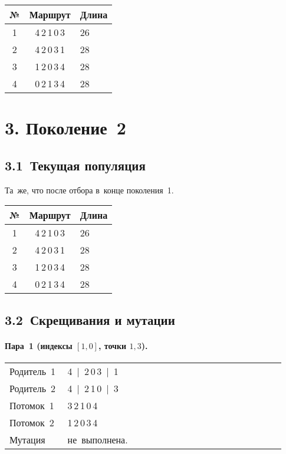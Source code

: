 \documentclass[a4paper,12pt]{article}
\begin{document}
\begin{center}
\begin{tabular}{ccl}
\toprule
№ & Маршрут & Длина\\\midrule
1 & 4\,2\,1\,0\,3 & 26\\
2 & 4\,2\,0\,3\,1 & 28\\
3 & 1\,2\,0\,3\,4 & 28\\
4 & 0\,2\,1\,3\,4 & 28\\
\bottomrule
\end{tabular}
\end{center}

\section*{3. Поколение 2}

\subsection*{3.1 Текущая популяция}

Та же, что после отбора в конце поколения 1.
\begin{center}
\begin{tabular}{ccl}
\toprule
№ & Маршрут & Длина\\\midrule
1 & 4\,2\,1\,0\,3 & 26\\
2 & 4\,2\,0\,3\,1 & 28\\
3 & 1\,2\,0\,3\,4 & 28\\
4 & 0\,2\,1\,3\,4 & 28\\
\bottomrule
\end{tabular}
\end{center}

\subsection*{3.2 Скрещивания и мутации}

\paragraph{Пара 1 (индексы $[1,0]$, точки $1,3$).}
\begin{longtable}{@{}p{0.18\linewidth}p{0.75\linewidth}@{}}
Родитель 1 & 4 \,|\, 2\,0\,3 \,|\, 1\\
Родитель 2 & 4 \,|\, 2\,1\,0 \,|\, 3\\
Потомок 1  & 3\,2\,1\,0\,4\\
Потомок 2  & 1\,2\,0\,3\,4\\
Мутация    & не выполнена.\\
\end{longtable}
\end{document}
